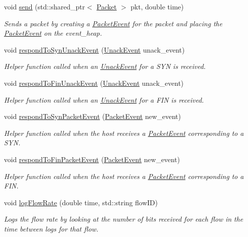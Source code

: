 \begin{DoxyCompactItemize}
void \hyperlink{classHost_a7aeac15cbcd5d64ff8c2af090d8db0c4}{send} (std\-::shared\-\_\-ptr$<$ \hyperlink{classPacket}{\-Packet} $>$ pkt, double time)
\begin{DoxyCompactList}\small\item\em \-Sends a packet by creating a \hyperlink{classPacketEvent}{\-Packet\-Event} for the packet and placing the \hyperlink{classPacketEvent}{\-Packet\-Event} on the event\-\_\-heap. \end{DoxyCompactList}\item 
void \hyperlink{classHost_a13a11214f204347c85388b28043459c2}{respond\-To\-Syn\-Unack\-Event} (\hyperlink{classUnackEvent}{\-Unack\-Event} unack\-\_\-event)
\begin{DoxyCompactList}\small\item\em \-Helper function called when an \hyperlink{classUnackEvent}{\-Unack\-Event} for a \-S\-Y\-N is received. \end{DoxyCompactList}\item 
void \hyperlink{classHost_a9f76466a0f9e8362f70c7990eae22641}{respond\-To\-Fin\-Unack\-Event} (\hyperlink{classUnackEvent}{\-Unack\-Event} unack\-\_\-event)
\begin{DoxyCompactList}\small\item\em \-Helper function called when an \hyperlink{classUnackEvent}{\-Unack\-Event} for a \-F\-I\-N is received. \end{DoxyCompactList}\item 
void \hyperlink{classHost_a55abc101a34bd2bc1aff724883a85ecc}{respond\-To\-Syn\-Packet\-Event} (\hyperlink{classPacketEvent}{\-Packet\-Event} new\-\_\-event)
\begin{DoxyCompactList}\small\item\em \-Helper function called when the host receives a \hyperlink{classPacketEvent}{\-Packet\-Event} corresponding to a \-S\-Y\-N. \end{DoxyCompactList}\item 
void \hyperlink{classHost_a6f3523a2e00b6aae6f5e9fa14b0f0e0f}{respond\-To\-Fin\-Packet\-Event} (\hyperlink{classPacketEvent}{\-Packet\-Event} new\-\_\-event)
\begin{DoxyCompactList}\small\item\em \-Helper function called when the host receives a \hyperlink{classPacketEvent}{\-Packet\-Event} corresponding to a \-F\-I\-N. \end{DoxyCompactList}\item 
void \hyperlink{classHost_ad35c542cd4f9259b0f5329eb104b5334}{log\-Flow\-Rate} (double time, std\-::string flow\-I\-D)
\begin{DoxyCompactList}\small\item\em \-Logs the flow rate by looking at the number of bits received for each flow in the time between logs for that flow. \end{DoxyCompactList}\end{DoxyCompactItemize}
